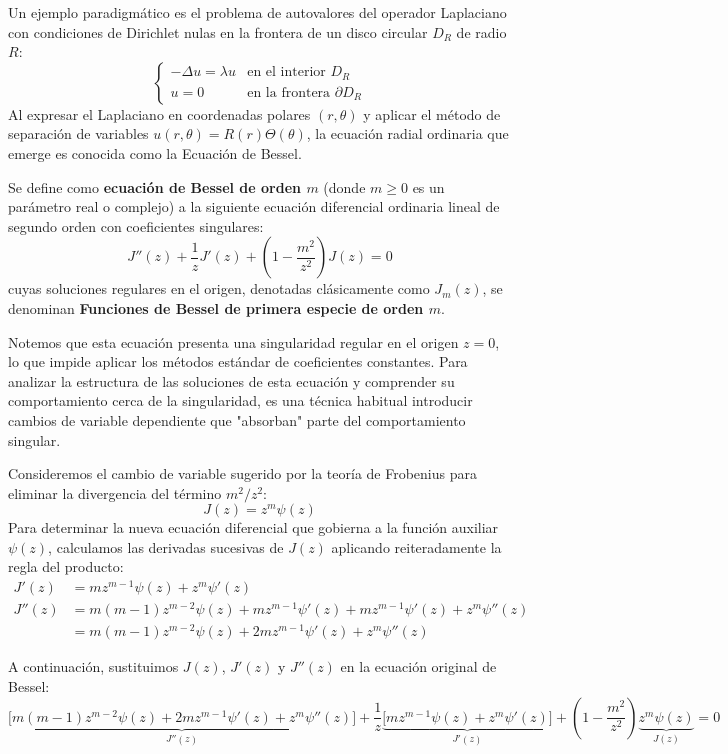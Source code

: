 Un ejemplo paradigmático es el problema de autovalores del operador Laplaciano con condiciones de Dirichlet nulas en la frontera de un disco circular $D_R$ de radio $R$:
\[
    \begin{cases}
        - \Delta u = \lambda u & \text{en el interior } D_R \\
        u = 0 & \text{en la frontera } \partial D_R
    \end{cases}
\]
Al expresar el Laplaciano en coordenadas polares $(r, \theta)$ y aplicar el método de separación de variables $u(r,\theta) = R(r)\Theta(\theta)$, la ecuación radial ordinaria que emerge es conocida como la Ecuación de Bessel.

\begin{definición}
    Se define como \textbf{ecuación de Bessel de orden $m$} (donde $m \geq 0$ es un parámetro real o complejo) a la siguiente ecuación diferencial ordinaria lineal de segundo orden con coeficientes singulares:
    \[
        J''(z) + \frac{1}{z} J'(z) + \left( 1 - \frac{m^2}{z^2} \right) J(z) = 0
    \]
    cuyas soluciones regulares en el origen, denotadas clásicamente como $J_m(z)$, se denominan \textbf{Funciones de Bessel de primera especie de orden $m$}.
\end{definición}

Notemos que esta ecuación presenta una singularidad regular en el origen $z=0$, lo que impide aplicar los métodos estándar de coeficientes constantes. Para analizar la estructura de las soluciones de esta ecuación y comprender su comportamiento cerca de la singularidad, es una técnica habitual introducir cambios de variable dependiente que "absorban" parte del comportamiento singular.

Consideremos el cambio de variable sugerido por la teoría de Frobenius para eliminar la divergencia del término $m^2/z^2$:
\[
    J(z) = z^m \psi(z)
\]
Para determinar la nueva ecuación diferencial que gobierna a la función auxiliar $\psi(z)$, calculamos las derivadas sucesivas de $J(z)$ aplicando reiteradamente la regla del producto:
\begin{align*}
    J'(z) &= m z^{m-1} \psi(z) + z^m \psi'(z) \\
    J''(z) &= m(m-1) z^{m-2} \psi(z) + m z^{m-1} \psi'(z) + m z^{m-1} \psi'(z) + z^m \psi''(z) \\
    &= m(m-1) z^{m-2} \psi(z) + 2m z^{m-1} \psi'(z) + z^m \psi''(z)
\end{align*}

A continuación, sustituimos $J(z)$, $J'(z)$ y $J''(z)$ en la ecuación original de Bessel:
\[
    \underbrace{\Big[ m(m-1) z^{m-2} \psi(z) + 2m z^{m-1} \psi'(z) + z^m \psi''(z) \Big]}_{J''(z)} + \frac{1}{z} \underbrace{\Big[ m z^{m-1} \psi(z) + z^m \psi'(z) \Big]}_{J'(z)} + \left( 1 - \frac{m^2}{z^2} \right) \underbrace{z^m \psi(z)}_{J(z)} = 0
\]

